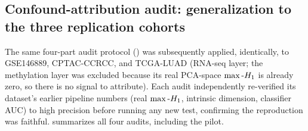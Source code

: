\subsection{Confound-attribution audit: generalization to the three replication cohorts}
\label{sec:results-confound-generalization}

The same four-part audit protocol () was subsequently applied, identically, to
GSE146889, CPTAC-CCRCC, and TCGA-LUAD (RNA-seq layer; the methylation layer was excluded because its
real PCA-space $\max\text{-}H_1$ is already zero, so there is no signal to attribute). Each audit independently
re-verified its dataset's earlier pipeline numbers (real $\max\text{-}H_1$, intrinsic dimension, classifier AUC)
to high precision before running any new test, confirming the reproduction was faithful. 
summarizes all four audits, including the pilot.


